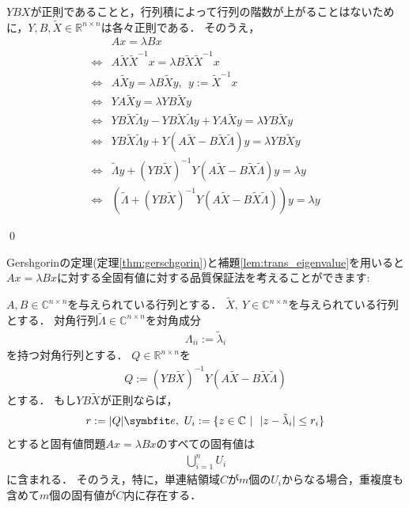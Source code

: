 \begin{Proof}
	$YBX$が正則であることと，行列積によって行列の階数が上がることはないために，$Y, B, \tilde{X} \in {\mathbb R}^{n \times n}$は各々正則である．
	そのうえ，
	\begin{align*}
		& A x = \lambda B x \\
		\Leftrightarrow& A \tilde{X} \tilde{X}^{-1}x = \lambda B \tilde{X} \tilde{X}^{-1} x \\
		\Leftrightarrow& A \tilde{X} y = \lambda B \tilde{X} y, ~~ y := \tilde{X}^{-1}x \\
		\Leftrightarrow& Y A \tilde{X} y = \lambda Y B \tilde{X} y \\
		\Leftrightarrow& Y B \tilde{X} \tilde{\Lambda} y - Y B \tilde{X} \tilde{\Lambda} y + Y A \tilde{X} y = \lambda Y B \tilde{X} y \\
		\Leftrightarrow& Y B \tilde{X} \tilde{\Lambda} y + Y \left(  A \tilde{X} - B \tilde{X} \tilde{\Lambda}  \right) y  = \lambda Y B \tilde{X} y \\
		\Leftrightarrow& \tilde{\Lambda} y + \left( Y B \tilde{X} \right)^{-1} Y \left(  A \tilde{X} - B \tilde{X} \tilde{\Lambda} \right) y  = \lambda y \\
		\Leftrightarrow& \left( \tilde{\Lambda} + \left( Y B \tilde{X} \right)^{-1} Y \left(  A \tilde{X}  - B \tilde{X} \tilde{\Lambda} \right) \right) y  = \lambda y
	\end{align*}	
	
	\qed
\end{Proof}

Gershgorinの定理(定理\ref{thm:gerschgorin})と補題\ref{lem:trans_eigenvalue}を用いると$Ax = \lambda B x$に対する全固有値に対する品質保証法を考えることができます:


\begin{Thm} \label{thm:eig_basic}
	$A, B \in {\mathbb C}^{n \times n}$を与えられている行列とする．
	$\tilde{X}, ~ Y \in {\mathbb C}^{n \times n}$を与えられている行列とする．
	対角行列$\tilde{\Lambda} \in {\mathbb C}^{n \times n}$を対角成分
	\begin{align*}
		\Lambda_{ii} := \tilde{\lambda}_i
	\end{align*}
	を持つ対角行列とする．
	$Q \in {\mathbb R}^{n \times n}$を
	\begin{align*}
		Q := (Y B \tilde{X})^{-1} Y ( A \tilde{X} - B \tilde{X} \tilde{\Lambda} )
	\end{align*}
	とする．
	もし$Y B \tilde{X}$が正則ならば，
	\begin{align*}
		r := | Q | \vector{e}, ~ U_i := \{ z \in {\mathbb C} ~|~~ | z - \tilde{\lambda}_i | \le r_i  \}
	\end{align*}
	とすると固有値問題$A x = \lambda B x$のすべての固有値は
	\begin{align*}
		\bigcup_{i = 1}^{n} U_i
	\end{align*}
	に含まれる．
	そのうえ，特に，単連結領域$C$が$m$個の$U_i$からなる場合，重複度も含めて$m$個の固有値が$C$内に存在する．
\end{Thm}

